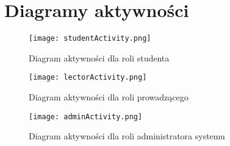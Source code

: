 \documentclass[a4paper, titlepage]{article}
\begin{document}
	\section{Diagramy aktywności}
    \begin{figure}[H]
      \centering
      \texttt{[image: studentActivity.png]}
      \caption{Diagram aktywności dla roli studenta}
  \end{figure}
  
  \begin{figure}[H]
      \centering
      \texttt{[image: lectorActivity.png]}
      \caption{Diagram aktywności dla roli prowadzącego}
  \end{figure}

\begin{figure}[H]
      \centering
      \texttt{[image: adminActivity.png]}
      \caption{Diagram aktywności dla roli administratora systemu}
  \end{figure}
\end{document}
